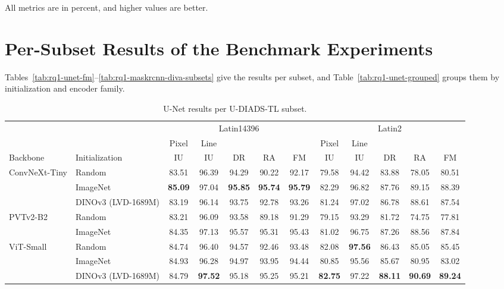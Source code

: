 All metrics are in percent, and higher values are better.

\FloatBarrier
\section{Per-Subset Results of the Benchmark Experiments}
\label{app:rq1-subsets}

Tables~\ref{tab:rq1-unet-fm}--\ref{tab:rq1-maskrcnn-diva-subsets} give the results per subset, and Table~\ref{tab:rq1-unet-grouped} groups them by initialization and encoder family.

\begin{table}[htbp]
    \centering
    \scriptsize
    \setlength{\tabcolsep}{1.3pt}
    \renewcommand{\arraystretch}{0.92}
    \caption{U-Net results per U-DIADS-TL subset.}
    \label{tab:rq1-unet-fm}\label{tab:rq1-unet-udiads-subsets}\label{tab:rq1-unet-udiads-average}
    \begin{tabular*}{\textwidth}{@{\extracolsep{\fill}}ll*{10}{c}@{}}
        \toprule
        & & \multicolumn{5}{c}{Latin14396} & \multicolumn{5}{c}{Latin2} \\
        \cmidrule(lr){3-7}\cmidrule(l){8-12}
        & & Pixel & Line & & & & Pixel & Line & & & \\
        Backbone & Initialization & IU & IU & DR & RA & FM & IU & IU & DR & RA & FM \\
        \midrule
        ConvNeXt-Tiny & Random & 83.51 & 96.39 & 94.29 & 90.22 & 92.17 & 79.58 & 94.42 & 83.88 & 78.05 & 80.51 \\
         & ImageNet & \textbf{85.09} & 97.04 & \textbf{95.85} & \textbf{95.74} & \textbf{95.79} & 82.29 & 96.82 & 87.76 & 89.15 & 88.39 \\
         & DINOv3 (LVD-1689M) & 83.19 & 96.14 & 93.75 & 92.78 & 93.26 & 81.24 & 97.02 & 86.78 & 88.61 & 87.54 \\
        \addlinespace[1pt]
        PVTv2-B2 & Random & 83.21 & 96.09 & 93.58 & 89.18 & 91.29 & 79.15 & 93.29 & 81.72 & 74.75 & 77.81 \\
         & ImageNet & 84.35 & 97.13 & 95.57 & 95.31 & 95.43 & 81.02 & 96.75 & 87.26 & 88.56 & 87.84 \\
        \addlinespace[1pt]
        ViT-Small & Random & 84.74 & 96.40 & 94.57 & 92.46 & 93.48 & 82.08 & \textbf{97.56} & 86.43 & 85.05 & 85.45 \\
         & ImageNet & 84.93 & 96.28 & 94.97 & 93.95 & 94.44 & 80.85 & 95.56 & 85.67 & 80.95 & 83.02 \\
         & DINOv3 (LVD-1689M) & 84.79 & \textbf{97.52} & 95.18 & 95.25 & 95.21 & \textbf{82.75} & 97.22 & \textbf{88.11} & \textbf{90.69} & \textbf{89.24} \\

\end{tabular*}
\end{table}
